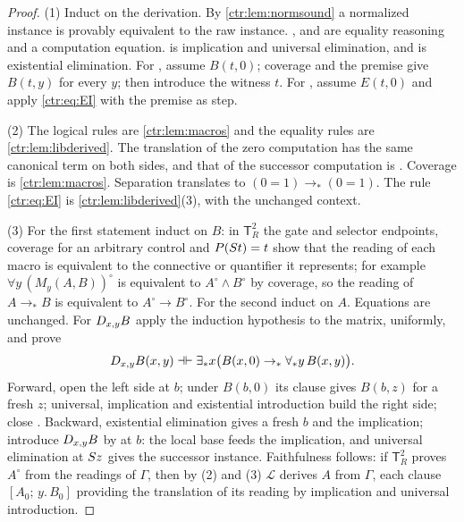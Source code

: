\begin{proof}
(1) Induct on the derivation. By \cref{ctr:lem:normsound} a normalized instance is provably
equivalent to the raw instance. ,  and  are
equality reasoning and a computation equation.  is implication and universal
elimination, and  is existential elimination. For , assume
$B(t,0)$; coverage and the premise give $B(t,y)$ for every $y$; then introduce the witness
$t$. For , assume $E(t,0)$ and apply \eqref{ctr:eq:EI} with the premise as
step.

(2) The logical rules are \cref{ctr:lem:macros} and the equality rules are
\cref{ctr:lem:libderived}. The translation of the zero computation has the same canonical
term on both sides, and that of the successor computation is . Coverage is
\cref{ctr:lem:macros}. Separation translates to $(0=1)\to_*(0=1)$. The rule
\eqref{ctr:eq:EI} is \cref{ctr:lem:libderived}(3), with the unchanged context.

(3) For the first statement induct on $B$: in $\mathsf T_R^2$ the gate and selector
endpoints, coverage for an arbitrary control and $P(S t)=t$ show that the reading of each
macro is equivalent to the connective or quantifier it represents; for example
$\forall y\,(M_y(A,B))^\circ$ is equivalent to $A^\circ\land B^\circ$ by coverage, so the
reading of $A\to_*B$ is equivalent to $A^\circ\to B^\circ$. For the second induct on $A$.
Equations are unchanged. For $D_{x,y}B$ apply the induction hypothesis to the matrix,
uniformly, and prove
\[
 D_{x,y}B(x,y)\dashv\vdash
 \exists_*x\bigl(B(x,0)\to_*\forall_*y\,B(x,y)\bigr).
\]
Forward, open the left side at $b$; under $B(b,0)$ its clause gives $B(b,z)$ for a fresh
$z$; universal, implication and existential introduction build the right side; close
. Backward, existential elimination gives a fresh $b$ and the implication;
introduce $D_{x,y}B$ by  at $b$: the local base feeds the implication, and
universal elimination at $S z$ gives the successor instance. Faithfulness follows: if
$\mathsf T_R^2$ proves $A^\circ$ from the readings of $\Gamma$, then by (2) and (3)
$\mathcal L$ derives $A$ from $\Gamma$, each clause $[A_0;\,y.\,B_0]$ providing the
translation of its reading by implication and universal introduction.
\end{proof}

